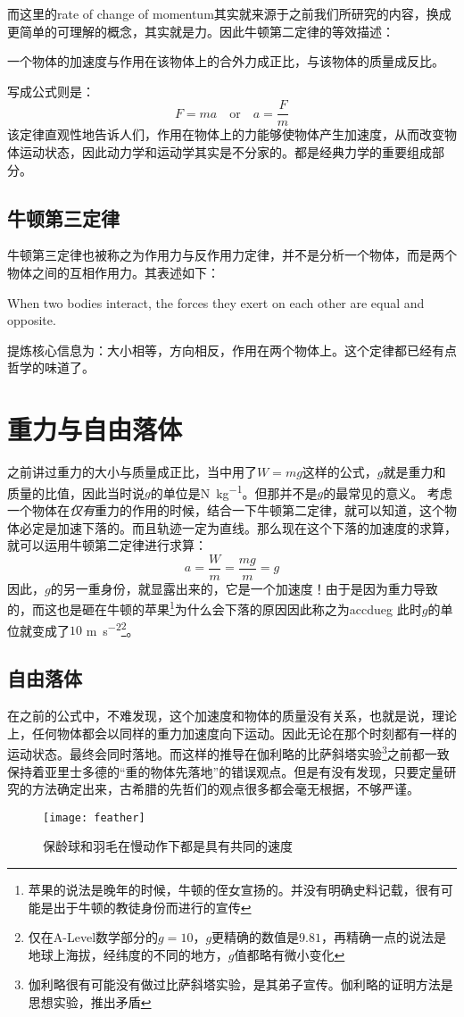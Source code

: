 而这里的rate of change of momentum其实就来源于之前我们所研究的内容，换成更简单的可理解的概念，其实就是力。因此牛顿第二定律的等效描述：
\begin{corollary}
一个物体的加速度与作用在该物体上的合外力成正比，与该物体的质量成反比。
\end{corollary}

写成公式则是：
\[
	F=ma \quad  \text{or} \quad a=\frac{F}{m}
\]
该定律直观性地告诉人们，作用在物体上的力能够使物体产生加速度，从而改变物体运动状态，因此动力学和运动学其实是不分家的。都是经典力学的重要组成部分。

\subsection*{牛顿第三定律}
牛顿第三定律也被称之为作用力与反作用力定律，并不是分析一个物体，而是两个物体之间的互相作用力。其表述如下：
\begin{theorem}
When two bodies interact, the forces they exert on each other are equal and opposite.
\end{theorem}
提炼核心信息为：大小相等，方向相反，作用在两个物体上。这个定律都已经有点哲学的味道了。
\clearpage

\section{重力与自由落体}
之前讲过重力的大小与质量成正比，当中用了$W=mg$这样的公式，$g$就是重力和质量的比值，因此当时说$g$的单位是\si{\N\per\kg}。但那并不是$g$的最常见的意义。
考虑一个物体在\emph{仅有}重力的作用的时候，结合一下牛顿第二定律，就可以知道，这个物体必定是加速下落的。而且轨迹一定为直线。那么现在这个下落的加速度的求算，就可以运用牛顿第二定律进行求算：
\[
	a=\frac{W}{m}=\frac{mg}{m}=g
\]
因此，$g$的另一重身份，就显露出来的，它是一个加速度！由于是因为重力导致的，而这也是砸在牛顿的苹果\footnote{苹果的说法是晚年的时候，牛顿的侄女宣扬的。并没有明确史料记载，很有可能是出于牛顿的教徒身份而进行的宣传}为什么会下落的原因因此称之为\gls{accdueg} 此时$g$的单位就变成了$10$ \si{\m\per\square\s}\footnote{仅在A-Level数学部分的$g=10$，$g$更精确的数值是$9.81$，再精确一点的说法是地球上海拔，经纬度的不同的地方，$g$值都略有微小变化}。

\subsection*{自由落体}
\label{subse:Free Fall}
在之前的公式中，不难发现，这个加速度和物体的质量没有关系，也就是说，理论上，任何物体都会以同样的重力加速度向下运动。因此无论在那个时刻都有一样的运动状态。最终会同时落地。而这样的推导在伽利略的比萨斜塔实验\footnote{伽利略很有可能没有做过比萨斜塔实验，是其弟子宣传。伽利略的证明方法是思想实验，推出矛盾}之前都一致保持着亚里士多德的``重的物体先落地''的错误观点。但是有没有发现，只要定量研究的方法确定出来，古希腊的先哲们的观点很多都会毫无根据，不够严谨。
\begin{figure}[H]
\centering
\texttt{[image: feather]}
\caption{保龄球和羽毛在慢动作下都是具有共同的速度}
\end{figure}

